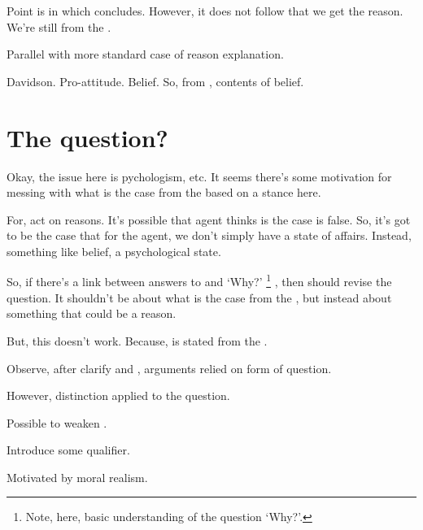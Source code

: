 \begin{note}[Limitation]
  \color{blue}
  Point is \fc{} in which concludes.
  However, it does not follow that we get the reason.
  We're still from the \agpe{}.

  Parallel with more standard case of reason explanation.

  Davidson.
  Pro-attitude.
  Belief.
  So, from \agpe{}, contents of belief.
\end{note}

\newpage

\section{The question?}
\label{cha:zSpA:sec:ptivity-question}

\begin{note}
  \color{red}
  Okay, the issue here is pychologism, etc.
  It seems there's some motivation for messing with what is the case from the \agpe{} based on a stance here.

  For, act on reasons.
  It's possible that agent thinks is the case is false.
  So, it's got to be the case that for the agent, we don't simply have a state of affairs.
  Instead, something like belief, a psychological state.

  So, if there's a link between answers to \qzS{} and `Why?'%
  \footnote{
    Note, here, basic understanding of the question `Why?'.
  }
  , then should revise the question.
  It shouldn't be about what is the case from the \agpe{}, but instead about something that could be a reason.

  But, this doesn't work.
  Because, \qWhyV{} is stated from the \agpe{}.
\end{note}

\begin{note}
  Observe, after clarify \ptivity{} and \ptivityQ{}, arguments relied on form of question.

  However, distinction applied to the question.

  Possible to weaken \qzS{}.

  Introduce some qualifier.

  Motivated by moral realism.
\end{note}


